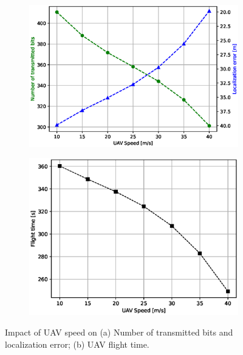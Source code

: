 \documentclass[journal,twocolumn]{IEEEtran}
\begin{document}
{\begin{figure}
\begin{center}
\captionsetup{justification=centering}
        \begin{subfigure}[b]{0.33\textwidth}
                \centering
                \includegraphics[width=1\linewidth]{Figures/new_fig_1.eps}
                \caption{}
                \label{fig.2a}
        \end{subfigure}%
        \begin{subfigure}[b]{0.33\textwidth}
                \centering
                \includegraphics[width=1\linewidth]{Figures/new_fig_2.eps}
                \caption{}
                \label{fig.2b}
        \end{subfigure}%
        \caption{Impact of UAV speed on (a) Number of transmitted bits and localization error; (b) UAV flight time.}\label{fig.2}
\end{center}
\end{figure}


}
\end{document}
